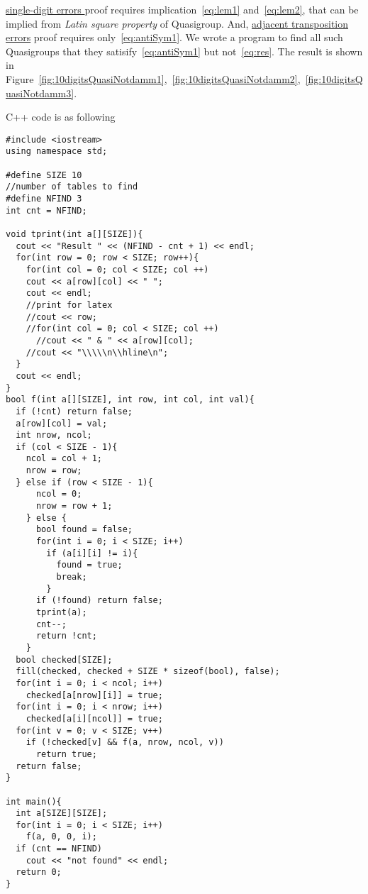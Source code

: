 \underline{single-digit errors } proof requires implication~\ref{eq:lem1} and~\ref{eq:lem2}, that can be implied from \emph{ Latin square property} of Quasigroup. And, \underline{ adjacent transposition errors} proof requires only~\ref{eq:antiSym1}. We wrote a program to find all such Quasigroups that they satisify~\ref{eq:antiSym1} but not~\ref{eq:res}. The result is shown in Figure~\ref{fig:10digitsQuasiNotdamm1},~\ref{fig:10digitsQuasiNotdamm2},~\ref{fig:10digitsQuasiNotdamm3}.

C++ code is as following

\begin{verbatim}
#include <iostream>
using namespace std;

#define SIZE 10
//number of tables to find
#define NFIND 3
int cnt = NFIND;

void tprint(int a[][SIZE]){
  cout << "Result " << (NFIND - cnt + 1) << endl;
  for(int row = 0; row < SIZE; row++){
    for(int col = 0; col < SIZE; col ++)
    cout << a[row][col] << " ";
    cout << endl;
    //print for latex
    //cout << row;
    //for(int col = 0; col < SIZE; col ++)
      //cout << " & " << a[row][col];
    //cout << "\\\\\n\\hline\n";
  }
  cout << endl;
}
bool f(int a[][SIZE], int row, int col, int val){
  if (!cnt) return false;
  a[row][col] = val;
  int nrow, ncol;
  if (col < SIZE - 1){
    ncol = col + 1;
    nrow = row;
  } else if (row < SIZE - 1){
      ncol = 0;
      nrow = row + 1;
    } else {
      bool found = false;
      for(int i = 0; i < SIZE; i++)
        if (a[i][i] != i){
          found = true;
          break;
        }
      if (!found) return false;
      tprint(a);
      cnt--;
      return !cnt;
    }
  bool checked[SIZE];
  fill(checked, checked + SIZE * sizeof(bool), false);
  for(int i = 0; i < ncol; i++)
    checked[a[nrow][i]] = true;
  for(int i = 0; i < nrow; i++)
    checked[a[i][ncol]] = true;
  for(int v = 0; v < SIZE; v++)
    if (!checked[v] && f(a, nrow, ncol, v))
      return true;
  return false;
}

int main(){
  int a[SIZE][SIZE];
  for(int i = 0; i < SIZE; i++)
    f(a, 0, 0, i);
  if (cnt == NFIND)
    cout << "not found" << endl;
  return 0;
}
\end{verbatim}


